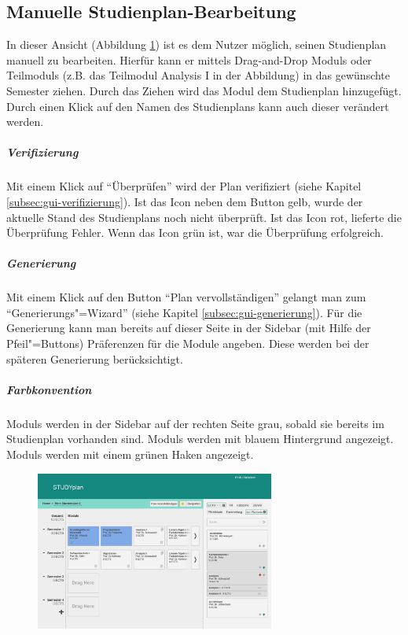 \subsection{Manuelle Studienplan-Bearbeitung}
\label{subsec:gui-manuelle-bearbeitung}
In dieser Ansicht (Abbildung \ref{fig:gui-bearbeitung-1}) ist es dem Nutzer möglich, seinen \gls{Studienplan} manuell zu bearbeiten. Hierfür kann er mittels \gls{Drag-and-Drop} \glspl{Modul} oder \glspl{Teilmodul} (z.B. das \gls{Teilmodul} Analysis I in der Abbildung) in das gewünschte Semester ziehen. Durch das Ziehen wird das \gls{Modul} dem \gls{Studienplan} hinzugefügt. Durch einen Klick auf den Namen des \gls{Studienplan}s kann auch dieser verändert werden.
\subparagraph{Verifizierung}
Mit einem Klick auf \enquote{Überprüfen} wird der Plan verifiziert (siehe Kapitel \ref{subsec:gui-verifizierung}).\newline
Ist das Icon neben dem Button gelb, wurde der aktuelle Stand des \gls{Studienplan}s noch nicht überprüft. Ist das Icon rot, lieferte die Überprüfung Fehler. Wenn das Icon grün ist, war die Überprüfung erfolgreich.
\subparagraph{Generierung}
Mit einem Klick auf den Button \enquote{Plan vervollständigen} gelangt man zum \enquote{Generierungs"=Wizard} (siehe Kapitel \ref{subsec:gui-generierung}). Für die Generierung kann man bereits auf dieser Seite in der Sidebar (mit Hilfe der Pfeil"=Buttons) Präferenzen für die Module angeben. Diese werden bei der späteren Generierung berücksichtigt.
\subparagraph{Farbkonvention}
\glspl{Modul} werden in der Sidebar auf der rechten Seite grau, sobald sie bereits im \gls{Studienplan} vorhanden sind.\newline
{} \glspl{Modul} werden mit blauem Hintergrund angezeigt.
 \glspl{Modul} werden mit einem grünen Haken angezeigt.
\begin{figure}[!htb]
	\caption{}
	\label{fig:gui-bearbeitung-1}
	\centering
	\includegraphics[width=0.7\textwidth]{../GUI/ergebnisse/bearbeitung-1.png}
\end{figure}

